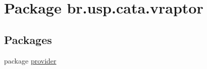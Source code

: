 \hypertarget{namespacebr_1_1usp_1_1cata_1_1vraptor}{\section{Package br.\+usp.\+cata.\+vraptor}
\label{namespacebr_1_1usp_1_1cata_1_1vraptor}
}
\subsection*{Packages}
\begin{DoxyCompactItemize}
\item 
package \hyperlink{namespacebr_1_1usp_1_1cata_1_1vraptor_1_1provider}{provider}
\end{DoxyCompactItemize}

